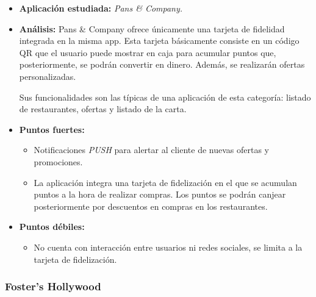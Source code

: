 \documentclass[twoside]{report}
\begin{document}
\begin{itemize}
\item \textbf{Aplicación estudiada:} \cite{pansapp} \textit{Pans \& Company.}
\item \textbf{Análisis:} 
Pans \& Company ofrece únicamente una tarjeta de fidelidad integrada en la misma app. Esta tarjeta básicamente consiste en un código QR que el usuario puede mostrar en caja para acumular puntos que, posteriormente, se podrán convertir en dinero. Además, se realizarán ofertas personalizadas.

Sus funcionalidades son las típicas de una aplicación de esta categoría: listado de restaurantes, ofertas y listado de la carta.
\item \textbf{Puntos fuertes:}
	\begin{itemize}
	\item Notificaciones \textit{PUSH} para alertar al cliente de nuevas ofertas y promociones.
	\item La aplicación integra una tarjeta de fidelización en el que se acumulan puntos a la hora de realizar compras. Los puntos se podrán canjear posteriormente por descuentos en compras en los restaurantes.
	\end{itemize}
\item \textbf{Puntos débiles:}
	\begin{itemize}
	\item No cuenta con interacción entre usuarios ni redes sociales, se limita a la tarjeta de fidelización.
	\end{itemize}
\end{itemize}

\subsubsection{Foster's Hollywood}
\end{document}
